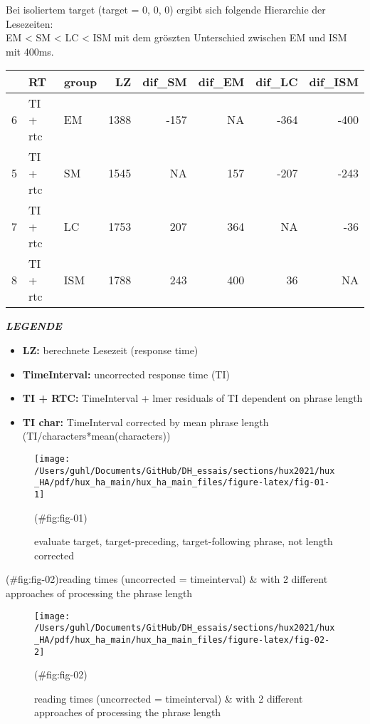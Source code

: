 \documentclass[
]{article}
\providecommand{\tightlist}{%
  \setlength{\itemsep}{0pt}\setlength{\parskip}{0pt}}
\begin{document}
Bei isoliertem target (target = 0, 0, 0) ergibt sich folgende Hierarchie der Lesezeiten:\\
EM \textless{} SM \textless{} LC \textless{} ISM mit dem gröszten Unterschied zwischen EM und ISM mit 400ms.

\begin{tabular}{l|l|l|r|r|r|r|r}
\hline
  & RT & group & LZ & dif\_SM & dif\_EM & dif\_LC & dif\_ISM\\
\hline
6 & TI + rtc & EM & 1388 & -157 & NA & -364 & -400\\
\hline
5 & TI + rtc & SM & 1545 & NA & 157 & -207 & -243\\
\hline
7 & TI + rtc & LC & 1753 & 207 & 364 & NA & -36\\
\hline
8 & TI + rtc & ISM & 1788 & 243 & 400 & 36 & NA\\
\hline
\end{tabular}

\textbf{\emph{LEGENDE}}

\begin{itemize}
\tightlist
\item
  \textbf{LZ:} berechnete Lesezeit (response time)
\item
  \textbf{TimeInterval:} uncorrected response time (TI)\\
\item
  \textbf{TI + RTC:} TimeInterval + lmer residuals of TI dependent on phrase length\\
\item
  \textbf{TI char:} TimeInterval corrected by mean phrase length (TI/characters*mean(characters))
\end{itemize}

\begin{figure}[H]
\texttt{[image: /Users/guhl/Documents/GitHub/DH\_essais/sections/hux2021/hux\_HA/pdf/hux\_ha\_main/hux\_ha\_main\_files/figure-latex/fig-01-1]} \caption{evaluate target, target-preceding, target-following phrase, not length corrected}(\#fig:fig-01)
\end{figure}

(\#fig:fig-02)reading times (uncorrected = timeinterval) \& with 2 different approaches of processing the phrase length

\begin{figure}[H]
\texttt{[image: /Users/guhl/Documents/GitHub/DH\_essais/sections/hux2021/hux\_HA/pdf/hux\_ha\_main/hux\_ha\_main\_files/figure-latex/fig-02-2]} \caption{reading times (uncorrected = timeinterval) & with 2 different approaches of processing the phrase length}(\#fig:fig-02)
\end{figure}
\end{document}
